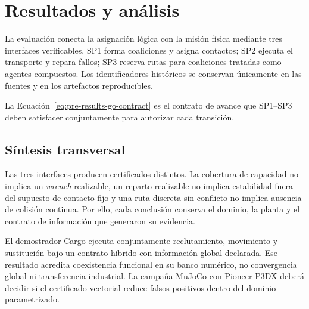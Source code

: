 \section{Resultados y análisis}
\label{sec:results}

La evaluación conecta la asignación lógica con la misión física mediante tres interfaces verificables. SP1 forma coaliciones y asigna contactos; SP2 ejecuta el transporte y repara fallos; SP3 reserva rutas para coaliciones tratadas como agentes compuestos. Los identificadores históricos se conservan únicamente en las fuentes y en los artefactos reproducibles.


La Ecuación~\eqref{eq:pre-results-go-contract} es el contrato de avance que
SP1--SP3 deben satisfacer conjuntamente para autorizar cada transición.



\clearpage


\clearpage


\clearpage






\clearpage
\subsection{Síntesis transversal}
\label{subsec:cross-discussion}

Las tres interfaces producen certificados distintos. La cobertura de capacidad no implica un \emph{wrench} realizable, un reparto realizable no implica estabilidad fuera del supuesto de contacto fijo y una ruta discreta sin conflicto no implica ausencia de colisión continua. Por ello, cada conclusión conserva el dominio, la planta y el contrato de información que generaron su evidencia.

El demostrador Cargo ejecuta conjuntamente reclutamiento, movimiento y sustitución bajo un contrato híbrido con información global declarada. Ese resultado acredita coexistencia funcional en su banco numérico, no convergencia global ni transferencia industrial. La campaña MuJoCo con Pioneer P3DX deberá decidir si el certificado vectorial reduce falsos positivos dentro del dominio parametrizado.

